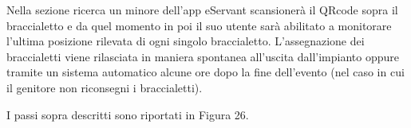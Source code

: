 Nella sezione ricerca un minore dell'app eServant scansionerà il QRcode sopra il braccialetto e da quel momento
in poi il suo utente sarà abilitato a monitorare l'ultima posizione rilevata di ogni singolo braccialetto.
L'assegnazione dei braccialetti viene rilasciata in maniera spontanea all'uscita dall'impianto oppure 
tramite un sistema automatico alcune ore dopo la fine dell'evento (nel caso in cui il genitore non riconsegni
i braccialetti).

I passi sopra descritti sono riportati in Figura 26.

\paragraph{}
\paragraph{}
\paragraph{}
\paragraph{}\paragraph{}
